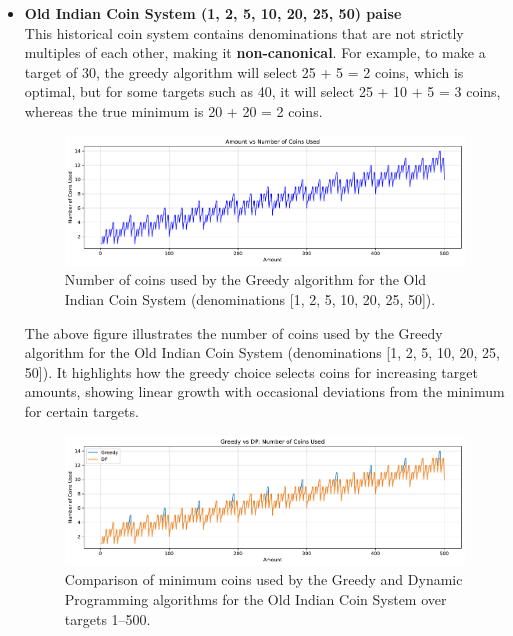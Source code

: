 \documentclass[12pt,a4paper]{report}
\begin{document}
\begin{itemize}
    \item \textbf{Old Indian Coin System (1, 2, 5, 10, 20, 25, 50) paise}\\
    This historical coin system contains denominations that are not strictly multiples of each other, making it \textbf{non-canonical}. For example, to make a target of 30, the greedy algorithm will select 25 + 5 = 2 coins, which is optimal, but for some targets such as 40, it will select 25 + 10 + 5 = 3 coins, whereas the true minimum is 20 + 20 = 2 coins.  
    \begin{figure}[H]
      \centering
      \includegraphics[width=\textwidth]{graphs/greedy_coins_indiancoinsystum_plot.pdf}
      \caption{Number of coins used by the Greedy algorithm for the Old Indian Coin System (denominations [1, 2, 5, 10, 20, 25, 50]).}
      \label{fig:greedy_coins_indiancoinsystum_plot}
    \end{figure}
    The above figure illustrates the number of coins used by the Greedy algorithm for the Old Indian Coin System (denominations [1, 2, 5, 10, 20, 25, 50]). It highlights how the greedy choice selects coins for increasing target amounts, showing linear growth with occasional deviations from the minimum for certain targets.

    \begin{figure}[H]
      \centering
      \includegraphics[width=\textwidth]{graphs/compare_coins_indiancoinsystum_plot.pdf}
      \caption{Comparison of minimum coins used by the Greedy and Dynamic Programming algorithms for the Old Indian Coin System over targets 1--500.}
      \label{fig:compare_coins_indiancoinsystum_plot}
    \end{figure}


\end{itemize}
\end{document}
